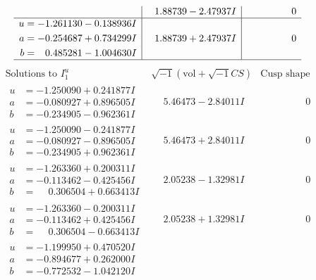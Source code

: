 \documentclass[1p]{elsarticle_modified}
\theoremstyle{definition}
\newcommand{\I}{\sqrt{-1}}
\begin{document}
$$\begin{array}{c|c|c}
 & \phantom{-}1.88739 - 2.47937 I & \phantom{-0.000000 } 0 \\ \hline\begin{aligned}
u &= -1.261130 - 0.138936 I \\
a &= -0.254687 + 0.734299 I \\
b &= \phantom{-}0.485281 - 1.004630 I\end{aligned}
 & \phantom{-}1.88739 + 2.47937 I & \phantom{-0.000000 } 0\\
 \hline 
 \end{array}$$\newpage$$\begin{array}{c|c|c}  
\text{Solutions to }I^u_{1}& \I (\text{vol} + \sqrt{-1}CS) & \text{Cusp shape}\\
 \hline 
\begin{aligned}
u &= -1.250090 + 0.241877 I \\
a &= -0.080927 + 0.896505 I \\
b &= -0.234905 - 0.962361 I\end{aligned}
 & \phantom{-}5.46473 - 2.84011 I & \phantom{-0.000000 } 0 \\ \hline\begin{aligned}
u &= -1.250090 - 0.241877 I \\
a &= -0.080927 - 0.896505 I \\
b &= -0.234905 + 0.962361 I\end{aligned}
 & \phantom{-}5.46473 + 2.84011 I & \phantom{-0.000000 } 0 \\ \hline\begin{aligned}
u &= -1.263360 + 0.200311 I \\
a &= -0.113462 - 0.425456 I \\
b &= \phantom{-}0.306504 + 0.663413 I\end{aligned}
 & \phantom{-}2.05238 - 1.32981 I & \phantom{-0.000000 } 0 \\ \hline\begin{aligned}
u &= -1.263360 - 0.200311 I \\
a &= -0.113462 + 0.425456 I \\
b &= \phantom{-}0.306504 - 0.663413 I\end{aligned}
 & \phantom{-}2.05238 + 1.32981 I & \phantom{-0.000000 } 0 \\ \hline\begin{aligned}
u &= -1.199950 + 0.470520 I \\
a &= -0.894677 + 0.262000 I \\
b &= -0.772532 - 1.042120 I\end{aligned}

\end{array}$$
\end{document}
